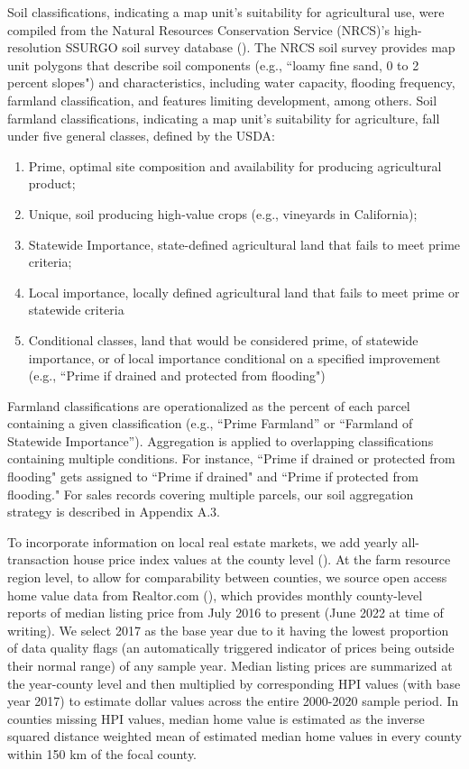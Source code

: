 \documentclass[12pt]{article}
\begin{document}
Soil classifications, indicating a map unit's suitability for agricultural use, were compiled from the Natural Resources Conservation Service (NRCS)’s high-resolution SSURGO soil survey database (\cite{SoilSurveyStaffSoilStates}). The NRCS soil survey provides map unit polygons that describe soil components (e.g., ``loamy fine sand, 0 to 2 percent slopes") and characteristics, including water capacity, flooding frequency, farmland classification, and features limiting development, among others. Soil farmland classifications, indicating a map unit's suitability for agriculture, fall under five general classes, defined by the USDA:
\begin{enumerate}
    \item Prime, optimal site composition and availability for producing agricultural product;  
    \item Unique, soil producing high-value crops (e.g., vineyards in California); 
    \item Statewide Importance, state-defined agricultural land that fails to meet prime criteria;
    \item Local importance, locally defined agricultural land that fails to meet prime or statewide criteria
    \item Conditional classes, land that would be considered prime, of statewide importance, or of local importance conditional on a specified improvement (e.g., ``Prime if drained and protected from flooding")
\end{enumerate}

Farmland classifications are operationalized as the percent of each parcel containing a given classification (e.g., ``Prime Farmland” or ``Farmland of Statewide Importance”). Aggregation is applied to overlapping classifications containing multiple conditions. For instance, ``Prime if drained or protected from flooding" gets assigned to ``Prime if drained" and ``Prime if protected from flooding." For sales records covering multiple parcels, our soil aggregation strategy is described in Appendix A.3. 

To incorporate information on local real estate markets, we add yearly all-transaction house price index values at the county level (\cite{FederalHousing2022}). At the farm resource region level, to allow for comparability between counties, we source open access home value data from Realtor.com (\cite{RealtorData}), which provides monthly county-level reports of median listing price from July 2016 to present (June 2022 at time of writing). We select 2017 as the base year due to it having the lowest proportion of data quality flags (an automatically triggered indicator of prices being outside their normal range) of any sample year. Median listing prices are summarized at the year-county level and then multiplied by corresponding HPI values (with base year 2017) to estimate dollar values across the entire 2000-2020 sample period. In counties missing HPI values, median home value is estimated as the inverse squared distance weighted mean of estimated median home values in every county within 150 km of the focal county. 
\end{document}
